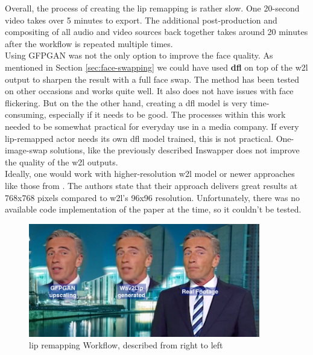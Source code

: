 \documentclass[
  a4paper,  %
  twoside,  %
  bibliography=totoc,
  headsepline,
  cleardoublepage=empty,
  parskip=half,
  draft=false
]{scrbook}
\begin{document}
Overall, the process of creating the lip remapping is rather slow. One 20-second video takes over 5 minutes to export. The additional post-production and compositing of all audio and video sources back together takes around 20 minutes after the workflow is repeated multiple times. \\
Using GFPGAN was not the only option to improve the face quality. As mentioned in Section \ref{sec:face-swapping} we could have used \textbf{\gls{dfl}} on top of the \gls{w2l} output to sharpen the result with a full face swap. The method has been tested on other occasions and works quite well. It also does not have issues with face flickering. But on the the other hand, creating a \gls{dfl} model is very time-consuming, especially if it needs to be good. The processes within this work needed to be somewhat practical for everyday use in a media company. If every lip-remapped actor needs its own \gls{dfl} model trained, this is not practical. One-image-swap solutions, like the previously described Inswapper does not improve the quality of the \gls{w2l} outputs. \\
Ideally, one would work with higher-resolution \gls{w2l} model or newer approaches like those from \citet{guptaGeneratingUltraHighResolution2023}. The authors state that their approach delivers great results at 768x768 pixels compared to \gls{w2l}'s 96x96 resolution. Unfortunately, there was no available code implementation of the paper at the time, so it couldn't be tested.
\begin{figure}[h]
  \centering
  \includegraphics[width=0.9\textwidth]{./graphics/images/wav2lip/wav2lip-demo.png}
  \caption{lip remapping Workflow, described from right to left}
  \label{fig:wav2lip-demo}
\end{figure}
\end{document}

